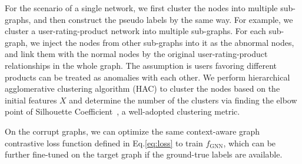{For the scenario of a single network, we first cluster the nodes into multiple sub-graphs, and then construct the pseudo labels by the same way. For example, we cluster a user-rating-product network into multiple sub-graphs. For each sub-graph, we inject the nodes from other sub-graphs into it as the abnormal nodes, and link them with the normal nodes by the original user-rating-product relationships in the whole graph. 
The assumption is users favoring different products can be treated as anomalies with each other. We perform hierarchical agglomerative clustering algorithm (HAC) to cluster the nodes based on the initial features $X$ and determine the number of the clusters via finding the elbow point of Silhouette Coefficient~\cite{rousseeuw1987silhouettes}, a well-adopted clustering metric. 


On the corrupt graphs, we can optimize the same context-aware graph contrastive loss function defined in Eq.\eqref{eq:loss} to train $f_{\text{GNN}}$, which can be further fine-tuned on the target graph if the ground-true labels are available. 

}
